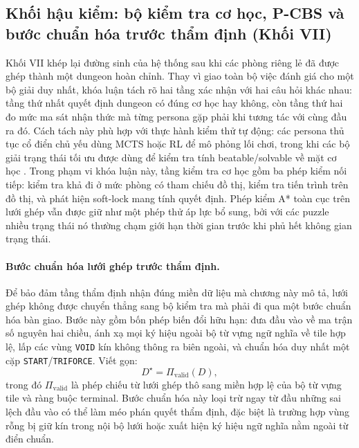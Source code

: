 \documentclass[oneside,a4paper,12pt]{extreport}
\begin{document}
\subsection{Khối hậu kiểm: bộ kiểm tra cơ học, P-CBS và bước chuẩn hóa trước thẩm định (Khối VII)}
Khối VII khép lại đường sinh của hệ thống sau khi các phòng riêng lẻ đã được
ghép thành một dungeon hoàn chỉnh. Thay vì giao toàn bộ việc đánh giá cho một
bộ giải duy nhất, khóa luận tách rõ hai tầng xác nhận với hai câu hỏi khác nhau:
tầng thứ nhất quyết định dungeon có đúng cơ học hay không, còn tầng thứ hai đo
mức ma sát nhận thức mà từng persona gặp phải khi tương tác với cùng đầu ra đó.
Cách tách này phù hợp với thực hành kiểm thử tự động: các persona thủ tục cổ
điển chủ yếu dùng MCTS hoặc RL để mô phỏng lối chơi, trong khi các
bộ giải trạng thái tối ưu được dùng để kiểm tra tính beatable/solvable về mặt
cơ học \cite{holmgard2016personasclones,holmgard2018proceduralpersonas,ariyurek2023beyondpersonas}. Trong phạm vi khóa luận này, tầng kiểm tra cơ học
gồm ba phép kiểm nối tiếp: kiểm tra khả đi ở mức phòng có tham chiếu đồ thị,
kiểm tra tiến trình trên đồ thị, và phát hiện soft-lock mang tính quyết định.
Phép kiểm A* toàn cục trên lưới ghép vẫn được
giữ như một phép thử áp lực bổ sung, bởi với các puzzle nhiều trạng thái nó
thường chạm giới hạn thời gian trước khi phủ hết không gian trạng thái.

\paragraph{Bước chuẩn hóa lưới ghép trước thẩm định.}
Để bảo đảm tầng thẩm định nhận đúng miền dữ liệu mà chương này mô tả, lưới ghép
không được chuyển thẳng sang bộ kiểm tra mà phải đi qua một bước chuẩn hóa bàn
giao. Bước này gồm bốn phép biến đổi hữu hạn: đưa đầu vào về ma trận số nguyên
hai chiều, ánh xạ mọi ký hiệu ngoài bộ từ vựng ngữ nghĩa về tile hợp lệ, lấp
các vùng \texttt{VOID} kín không thông ra biên ngoài, và chuẩn hóa duy nhất một
cặp \texttt{START}/\texttt{TRIFORCE}. Viết gọn:
\begin{equation}
D^{\star}=\Pi_{\mathrm{valid}}\!\left(D\right),
\end{equation}
trong đó $\Pi_{\mathrm{valid}}$ là phép chiếu từ lưới ghép thô sang miền hợp lệ
của bộ từ vựng tile và ràng buộc terminal. Bước chuẩn hóa này loại trừ ngay từ đầu
những sai lệch đầu vào có thể làm méo phán quyết thẩm định, đặc biệt là trường
hợp vùng rỗng bị giữ kín trong nội bộ lưới hoặc xuất hiện ký hiệu ngữ nghĩa nằm
ngoài từ điển chuẩn.
\end{document}
